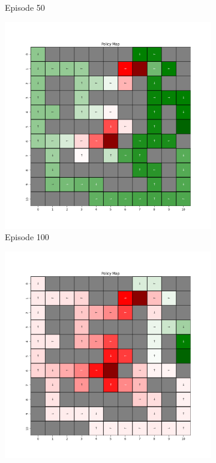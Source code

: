 \documentclass{assignment}
\begin{document}
\begin{figure}[H]
\begin{subfigure}{0.3\textwidth}
    \caption{Episode 50}
    \end{subfigure}\hfill
    \begin{subfigure}{0.3\textwidth}
        \includegraphics[width=\textwidth]{figures/policy_td/epsilon_sweep/policy_alpha_0.1_gamma_0.95_epsilon_1.0_iteration_100.png}
    \caption{Episode 100}
    \end{subfigure}
    \begin{subfigure}{0.3\textwidth}
        \includegraphics[width=\textwidth]{figures/policy_td/epsilon_sweep/policy_alpha_0.1_gamma_0.95_epsilon_1.0_iteration_1000.png}

\end{subfigure}
\end{figure}
\end{document}
